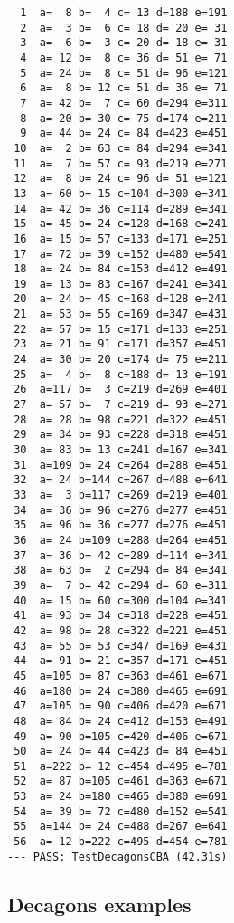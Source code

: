 \documentclass[11pt]{article}
\begin{document}
\setlength{\columnsep}{50pt}
\begin{multicols}{2}
\begin{lstlisting}
  1  a=  8 b=  4 c= 13 d=188 e=191
  2  a=  3 b=  6 c= 18 d= 20 e= 31
  3  a=  6 b=  3 c= 20 d= 18 e= 31
  4  a= 12 b=  8 c= 36 d= 51 e= 71
  5  a= 24 b=  8 c= 51 d= 96 e=121
  6  a=  8 b= 12 c= 51 d= 36 e= 71
  7  a= 42 b=  7 c= 60 d=294 e=311
  8  a= 20 b= 30 c= 75 d=174 e=211
  9  a= 44 b= 24 c= 84 d=423 e=451
 10  a=  2 b= 63 c= 84 d=294 e=341
 11  a=  7 b= 57 c= 93 d=219 e=271
 12  a=  8 b= 24 c= 96 d= 51 e=121
 13  a= 60 b= 15 c=104 d=300 e=341
 14  a= 42 b= 36 c=114 d=289 e=341
 15  a= 45 b= 24 c=128 d=168 e=241
 16  a= 15 b= 57 c=133 d=171 e=251
 17  a= 72 b= 39 c=152 d=480 e=541
 18  a= 24 b= 84 c=153 d=412 e=491
 19  a= 13 b= 83 c=167 d=241 e=341
 20  a= 24 b= 45 c=168 d=128 e=241
 21  a= 53 b= 55 c=169 d=347 e=431
 22  a= 57 b= 15 c=171 d=133 e=251
 23  a= 21 b= 91 c=171 d=357 e=451
 24  a= 30 b= 20 c=174 d= 75 e=211
 25  a=  4 b=  8 c=188 d= 13 e=191
 26  a=117 b=  3 c=219 d=269 e=401
 27  a= 57 b=  7 c=219 d= 93 e=271
 28  a= 28 b= 98 c=221 d=322 e=451
 29  a= 34 b= 93 c=228 d=318 e=451
 30  a= 83 b= 13 c=241 d=167 e=341
 31  a=109 b= 24 c=264 d=288 e=451
 32  a= 24 b=144 c=267 d=488 e=641
 33  a=  3 b=117 c=269 d=219 e=401
 34  a= 36 b= 96 c=276 d=277 e=451
 35  a= 96 b= 36 c=277 d=276 e=451
 36  a= 24 b=109 c=288 d=264 e=451
 37  a= 36 b= 42 c=289 d=114 e=341
 38  a= 63 b=  2 c=294 d= 84 e=341
 39  a=  7 b= 42 c=294 d= 60 e=311
 40  a= 15 b= 60 c=300 d=104 e=341
 41  a= 93 b= 34 c=318 d=228 e=451
 42  a= 98 b= 28 c=322 d=221 e=451
 43  a= 55 b= 53 c=347 d=169 e=431
 44  a= 91 b= 21 c=357 d=171 e=451
 45  a=105 b= 87 c=363 d=461 e=671
 46  a=180 b= 24 c=380 d=465 e=691
 47  a=105 b= 90 c=406 d=420 e=671
 48  a= 84 b= 24 c=412 d=153 e=491
 49  a= 90 b=105 c=420 d=406 e=671
 50  a= 24 b= 44 c=423 d= 84 e=451
 51  a=222 b= 12 c=454 d=495 e=781
 52  a= 87 b=105 c=461 d=363 e=671
 53  a= 24 b=180 c=465 d=380 e=691
 54  a= 39 b= 72 c=480 d=152 e=541
 55  a=144 b= 24 c=488 d=267 e=641
 56  a= 12 b=222 c=495 d=454 e=781
--- PASS: TestDecagonsCBA (42.31s)
\end{lstlisting}
\end{multicols}

\subsection{Decagons examples}
\end{document}
